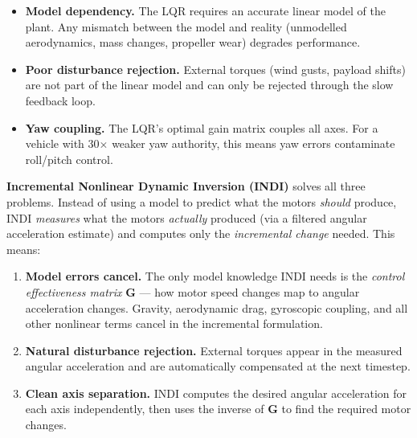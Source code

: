 \documentclass[12pt, a4paper]{article}
\begin{document}
\begin{itemize}
    \item \textbf{Model dependency.}  The LQR requires an accurate linear model of the plant.  Any mismatch between the model and reality (unmodelled aerodynamics, mass changes, propeller wear) degrades performance.
    \item \textbf{Poor disturbance rejection.}  External torques (wind gusts, payload shifts) are not part of the linear model and can only be rejected through the slow feedback loop.
    \item \textbf{Yaw coupling.}  The LQR's optimal gain matrix couples all axes.  For a vehicle with 30$\times$ weaker yaw authority, this means yaw errors contaminate roll/pitch control.
\end{itemize}

\textbf{Incremental Nonlinear Dynamic Inversion (INDI)} solves all three problems.  Instead of using a model to predict what the motors \emph{should} produce, INDI \emph{measures} what the motors \emph{actually} produced (via a filtered angular acceleration estimate) and computes only the \emph{incremental change} needed.  This means:

\begin{enumerate}[label=\arabic*.]
    \item \textbf{Model errors cancel.}  The only model knowledge INDI needs is the \emph{control effectiveness matrix} $\bm{G}$ --- how motor speed changes map to angular acceleration changes.  Gravity, aerodynamic drag, gyroscopic coupling, and all other nonlinear terms cancel in the incremental formulation.
    \item \textbf{Natural disturbance rejection.}  External torques appear in the measured angular acceleration and are automatically compensated at the next timestep.
    \item \textbf{Clean axis separation.}  INDI computes the desired angular acceleration for each axis independently, then uses the inverse of $\bm{G}$ to find the required motor changes.
\end{enumerate}
\end{document}
